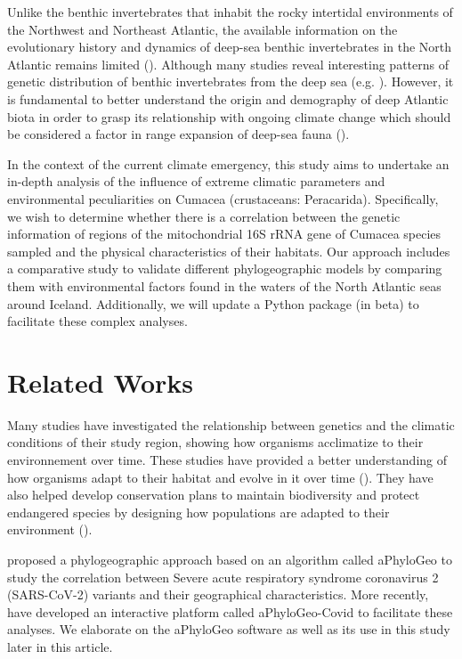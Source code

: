 Unlike the benthic invertebrates that inhabit the rocky intertidal environments of the Northwest and Northeast Atlantic, the available information on the evolutionary history and dynamics of deep-sea benthic invertebrates in the North Atlantic remains limited (\cite{jennings_phylogeographic_2014}). Although many studies reveal interesting patterns of genetic distribution of benthic invertebrates from the deep sea (e.g. \cite{wilson_historical_1998, havermans_genetic_2013}). However, it is fundamental to better understand the origin and demography of deep Atlantic biota in order to grasp its relationship with ongoing climate change which should be considered a factor in range expansion of deep-sea fauna (\cite{jennings_phylogeographic_2014}).

In the context of the current climate emergency, this study aims to undertake an in-depth analysis of the influence of extreme climatic parameters and environmental peculiarities on Cumacea (crustaceans: Peracarida). Specifically, we wish to determine whether there is a correlation between the genetic information of regions of the mitochondrial 16S rRNA gene of Cumacea species sampled and the physical characteristics of their habitats. Our approach includes a comparative study to validate different phylogeographic models by comparing them with environmental factors found in the waters of the North Atlantic seas around Iceland. Additionally, we will update a Python package (in beta) to facilitate these complex analyses.

\section{Related Works}\label{related-works}
Many studies have investigated the relationship between genetics and the climatic conditions of their study region, showing how organisms acclimatize to their environnement over time. These studies have provided a better understanding of how organisms adapt to their habitat and evolve in it over time (\cite{fc_genomic_2012}). They have also helped develop conservation plans to maintain biodiversity and protect endangered species by designing how populations are adapted to their environment (\cite{balkenhol_identifying_2009}).

\cite{koshkarov_phylogeography_2022} proposed a phylogeographic approach based on an algorithm called aPhyloGeo to study the correlation between Severe acute respiratory syndrome coronavirus 2 (SARS-CoV-2) variants and their geographical characteristics. More recently, \cite{li_aphylogeo-covid_2023} have developed an interactive platform called aPhyloGeo-Covid to facilitate these analyses.  We elaborate on the aPhyloGeo software as well as its use in this study later in this article.

